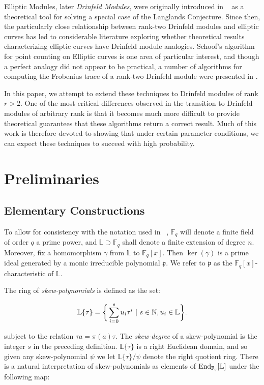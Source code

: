 \documentclass[sigconf]{acmart}
\newcommand{\F}{\mathbb{F}}
\newcommand{\N}{\mathbb{N}}
\renewcommand{\L}{\mathbb{L}}
\begin{document}
Elliptic Modules, later \textit{Drinfeld Modules}, were originally introduced in ~\cite{Drinfeld74} as a theoretical tool for solving a special case of the Langlands Conjecture. Since then, the particularly close relationship between rank-two Drinfeld modules and elliptic curves has led to considerable literature exploring whether theoretical results characterizing elliptic curves have Drinfeld module analogies. Schoof's algorithm for point counting on Elliptic curves is one area of particular interest, and though a perfect analogy did not appear to be practical, a number of algorithms for computing the Frobenius trace of a rank-two Drinfeld module were presented in \cite{MuslehSchost}.

In this paper, we attempt to extend these techniques to Drinfeld modules of rank $r > 2$. One of the most critical differences observed in the transition to Drinfeld modules of arbitrary rank is that it becomes much more difficult to provide theoretical guarantees that these algorithms return a correct result. Much of this work is therefore devoted to showing that under certain parameter conditions, we can expect these techniques to succeed with high probability.  

\section{Preliminaries}

\subsection{Elementary Constructions}
To allow for consistency with the notation used in ~\cite{MuslehSchost}, $\F_q$ will denote a finite field of order $q$ a prime power, and $\L \supset \F_q$ shall denote a finite extension of degree $n$. Moreover, fix a homomorphism $\gamma$ from $ \L$ to $\F_q[x]$. Then $\ker(\gamma)$ is a prime ideal generated by a monic irreducible polynomial $\mathfrak{p}$. We refer to $\mathfrak{p}$ as the $\mathbb{F}_q[x]$-characteristic of $\L$.

The ring of \textit{skew-polynomials} is defined as the set:

\begin{align*}
    \L\{\tau\} = \bigg\{ \sum_{i=0}^su_i\tau^i \textnormal{ | } s \in \N, u_i \in \L \bigg\}.
\end{align*}

subject to the relation $\tau a = \pi(a) \tau$. The \textit{skew-degree} of a skew-polynomial is the integer $s$ in the preceding definition. $\L\{\tau\}$ is a right Euclidean domain, and so given any skew-polynomial $\psi$ we let $\L\{ \tau \}/\psi$ denote the right quotient ring. 
There is a natural interpretation of skew-polynomials as elements of $\textnormal{End}_{\F_q}[\L]$ under the following map:
\end{document}
